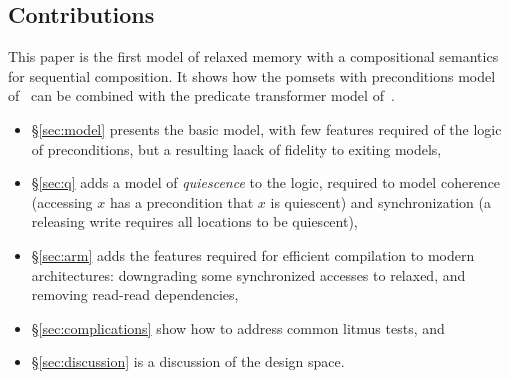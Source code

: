 \subsection{Contributions}

This paper is the first model of relaxed memory with a compositional
semantics for sequential composition.  It shows how the pomsets with
preconditions model of~\cite{DBLP:journals/pacmpl/JagadeesanJR20} can be combined
with the predicate transformer model of~\cite{???}.
\begin{itemize}
\item \S\ref{sec:model} presents the basic model, with few features
  required of the logic of preconditions, but a resulting laack of fidelity
  to exiting models,
\item \S\ref{sec:q} adds a model of \emph{quiescence} to the logic,
  required to model coherence (accessing $x$ has a precondition that $x$ is quiescent)
  and synchronization (a releasing write requires all locations to be quiescent),
\item \S\ref{sec:arm} adds the features required for efficient compilation
  to modern architectures: downgrading some synchronized accesses to relaxed,
  and removing read-read dependencies,
\item \S\ref{sec:complications} show how to address common litmus tests, and
\item \S\ref{sec:discussion} is a discussion of the design space.
\end{itemize}

